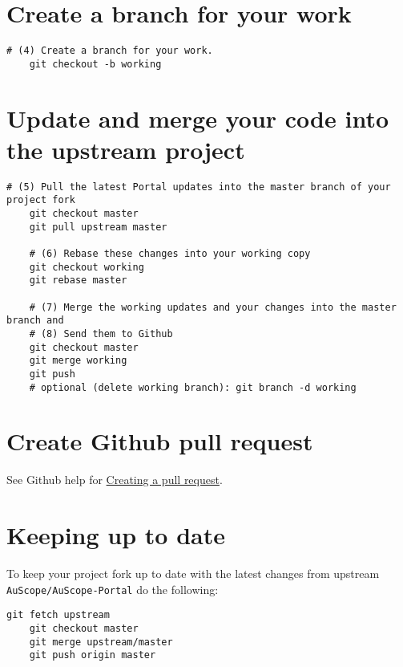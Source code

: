 \documentclass[a4paper]{article}
\begin{document}
\section{Create a branch for your work}

\begin{lstlisting}[style=BashInputStyle]
	# (4) Create a branch for your work.
	git checkout -b working
\end{lstlisting}

\begin{center}
\end{center}

\section{Update and merge your code into the upstream project}

\begin{lstlisting}[style=BashInputStyle]
	# (5) Pull the latest Portal updates into the master branch of your project fork
	git checkout master
	git pull upstream master

	# (6) Rebase these changes into your working copy
	git checkout working
	git rebase master

	# (7) Merge the working updates and your changes into the master branch and
	# (8) Send them to Github
	git checkout master
	git merge working
	git push
	# optional (delete working branch): git branch -d working
\end{lstlisting}

\section{Create Github pull request}

See Github help for \href{https://help.github.com/articles/creating-a-pull-request}{Creating a pull request}.

\section*{Keeping up to date}

To keep your project fork up to date with the latest changes from upstream \texttt{AuScope/AuScope-Portal} do the following:

\begin{lstlisting}[style=BashInputStyle]
	git fetch upstream
	git checkout master
	git merge upstream/master
	git push origin master
\end{lstlisting}
\end{document}
